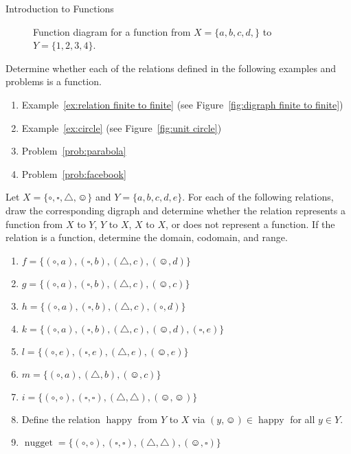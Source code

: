 \begin{section}{Introduction to Functions}
\begin{figure}[h!]
\begin{center}
\caption{Function diagram for a function from $X=\{a,b,c,d,\}$ to $Y=\{1,2,3,4\}$.}\label{fig:function diagram}
\end{center}
\end{figure}

\begin{problem}
Determine whether each of the relations defined in the following examples and problems is a function.
\begin{enumerate}[label=\textrm{(\alph*)}]
\item Example~\ref{ex:relation finite to finite} (see Figure~\ref{fig:digraph finite to finite})
\item Example~\ref{ex:circle} (see Figure~\ref{fig:unit circle})
\item Problem~\ref{prob:parabola}
\item Problem~\ref{prob:facebook}
\end{enumerate}
\end{problem}

\begin{problem}\label{prob:lots of potential functions}
Let $X=\{\circ, \square,\triangle,\smiley\}$ and $Y=\{a,b,c,d,e\}$. For each of the following relations, draw the corresponding digraph and determine whether the relation represents a function from $X$ to $Y$, $Y$ to $X$, $X$ to $X$, or does not represent a function. If the relation is a function, determine the domain, codomain, and range.
\begin{enumerate}[label=\textrm{(\alph*)}]
\item $f=\{(\circ, a),(\square,b),(\triangle,c),(\smiley,d)\}$
\item $g=\{(\circ, a),(\square,b),(\triangle,c),(\smiley,c)\}$
\item $h=\{(\circ, a),(\square,b),(\triangle,c),(\circ,d)\}$
\item $k=\{(\circ, a),(\square,b),(\triangle,c),(\smiley,d),(\square,e)\}$
\item $l=\{(\circ, e),(\square,e),(\triangle,e),(\smiley,e)\}$
\item $m=\{(\circ, a),(\triangle,b),(\smiley,c)\}$
\item \label{prob:identity} $i=\{(\circ,\circ),(\square, \square),(\triangle,\triangle),(\smiley,\smiley)\}$
\item\label{prob:happy} Define the relation $\operatorname{happy}$ from $Y$ to $X$ via $(y,\smiley)\in\operatorname{happy}$ for all $y\in Y$.
\item\label{prob:nugget} $\operatorname{nugget}=\{(\circ,\circ),(\square, \square),(\triangle,\triangle),(\smiley,\square)\}$
\end{enumerate}
\end{problem}


\end{section}

